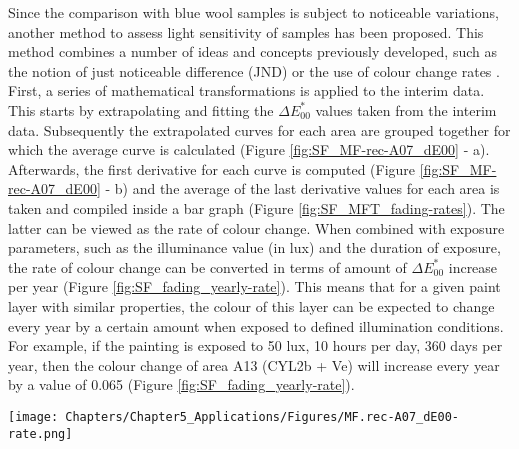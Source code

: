 Since the comparison with blue wool samples is subject to noticeable variations, another method to assess light sensitivity of samples has been proposed. This method combines a number of ideas and concepts previously developed, such as the notion of just noticeable difference (\acrshort{JND}) \citep{pesme_presentation_2016,crawford_just_1973} or the use of colour change rates \citep{prestel_classification_2017, giles_observations_1968}. First, a series of mathematical transformations is applied to the interim data. This starts by extrapolating and fitting the $\Delta E^*_{00}$ values taken from the interim data. Subsequently the extrapolated curves for each area are grouped together for which the average curve is calculated (Figure \ref{fig:SF_MF-rec-A07_dE00} - a). Afterwards, the first derivative for each curve is computed (Figure \ref{fig:SF_MF-rec-A07_dE00} - b) and the average of the last derivative values for each area is taken and compiled inside a bar graph (Figure \ref{fig:SF_MFT_fading-rates}). The latter can be viewed as the rate of colour change. When combined with exposure parameters, such as the illuminance value (in lux) and the duration of exposure, the rate of colour change can be converted in terms of amount of $\Delta E^*_{00}$ increase per year (Figure \ref{fig:SF_fading_yearly-rate}). This means that for a given paint layer with similar properties, the colour of this layer can be expected to change every year by a certain amount when exposed to defined illumination conditions. For example, if the painting is exposed to 50 lux, 10 hours per day, 360 days per year, then the colour change of area A13 (CYL2b + Ve) will increase every year by a value of 0.065 \dEOO (Figure \ref{fig:SF_fading_yearly-rate}). \\

\vspace{1cm}

\begin{figure*}[!h]
\centering
\texttt{[image: Chapters/Chapter5\_Applications/Figures/MF.rec-A07\_dE00-rate.png]}
\caption[\hspace{0.3cm}\textit{Sunflowers} reconstruction - MFT results on area A07]{\textit{Sunflowers} reconstruction - MFT results on area A07 - \dEOO curves and fading rates.}
\label{fig:SF_MF-rec-A07_dE00}
\end{figure*}  

